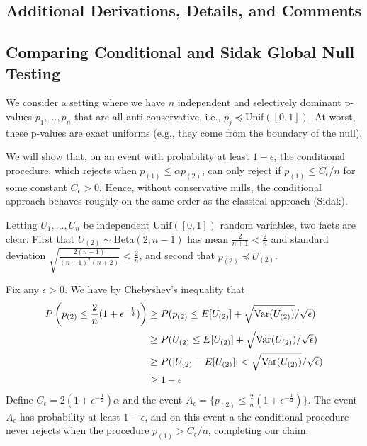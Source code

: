 \documentclass{article}
\newcommand{\Var}{\textup{Var}}
\begin{document}
\begin{appendix}

\section{Additional Derivations, Details, and Comments}

\subsection{Comparing Conditional and Sidak Global Null Testing}
\label{sec:beta_dist_appdx}

We consider a setting where we have $n$ independent and selectively dominant p-values $p_1, \dots, p_n$ that are all anti-conservative, i.e.,  $p_j \preceq \text{Unif}([0, 1])$. At worst, these p-values are exact uniforms (e.g., they come from the boundary of the null). 

We will show that, on an event with probability at least $1-\epsilon$, the conditional procedure, which rejects when $p_{(1)} \leq \alpha p_{(2)}$, can only reject if $p_{(1)} \leq C_{\epsilon}/n$ for some constant $C_{\epsilon} > 0$. Hence, without conservative nulls, the conditional approach behaves roughly on the same order as the classical approach (Sidak).   

Letting $U_1, \dots, U_n$ be independent $\text{Unif}([0, 1])$ random variables, two facts are clear. First that $U_{(2)} \sim \text{Beta}(2, n-1)$ has mean $\frac{2}{n + 1} < \frac{2}{n}$ and standard deviation $\sqrt{\frac{2(n-1)}{(n+1)^2(n+2)}} \leq \frac{2}{n}$, and second that $p_{(2)} \preceq U_{(2)}$. 

Fix any $\epsilon > 0$. We have by Chebyshev's inequality that  
\begin{align*}
    P\left(p_{(2)} \leq \frac{2}{n}(1 + \epsilon^{-\frac{1}{2}})\right) &\geq P(p_{(2)} \leq E[U_{(2)}] + \sqrt{\Var(U_{(2)})}/\sqrt{\epsilon})\\
    &\geq P(U_{(2)} \leq E[U_{(2)}] + \sqrt{\Var(U_{(2)})}/\sqrt{\epsilon})\\
    &\geq P(|U_{(2)} - E[U_{(2)}]| < \sqrt{\Var(U_{(2)})}/\sqrt{\epsilon} ) \\
    &\geq 1 - \epsilon
\end{align*}
Define $C_{\epsilon} = 2(1 + \epsilon^{-\frac{1}{2}})\alpha$ and the event $A_{\epsilon} = \{ p_{(2)} \leq \frac{2}{n}(1 + \epsilon^{-\frac{1}{2}})\}$. The event $A_{\epsilon}$ has probability at least $1-\epsilon$, and on this event a the conditional procedure never rejects when the procedure $p_{(1)} > C_{\epsilon}/n$, completing our claim. 


\end{appendix}
\end{document}
